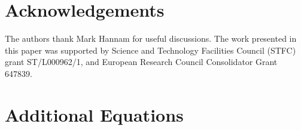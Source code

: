 \documentclass[twocolumn,aps,prd,floatfix,preprintnumbers,a4paper,nofootinbib,
superscriptaddress,10pt]{revtex4-1}
\begin{document}
\section*{Acknowledgements}
%
The authors thank Mark Hannam for useful discussions.
%
The work presented in this paper was supported by Science and Technology Facilities Council (STFC)
grant ST/L000962/1, and European Research Council Consolidator Grant 647839.
%

\newpage

%
\appendix


%
\newpage
\section{Additional Equations}
\label{app:eqns}



%
%
\begin{widetext}
  
\end{widetext}




\newpage
% 
% 

\end{document}
